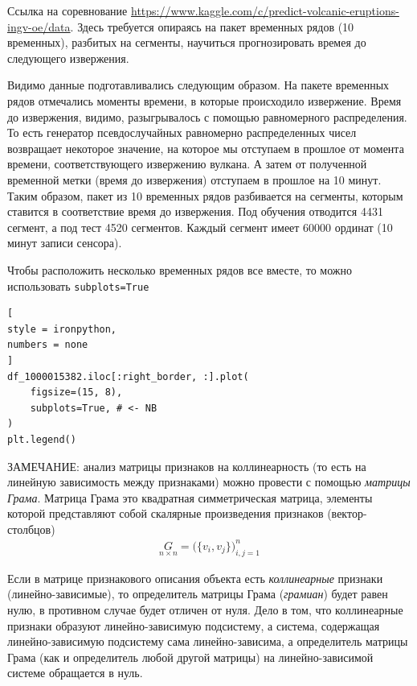 \documentclass[%
	11pt,
	a4paper,
	utf8,
		]{article}
\begin{document}
Ссылка на соревнование \url{https://www.kaggle.com/c/predict-volcanic-eruptions-ingv-oe/data}. Здесь требуется опираясь на пакет временных рядов (10 временных), разбитых на сегменты, научиться прогнозировать времея до следующего извержения.

Видимо данные подготавливались следующим образом. На пакете временных рядов отмечались моменты времени, в которые происходило извержение. Время до извержения, видимо, разыгрывалось с помощью равномерного распределения. То есть генератор псевдослучайных равномерно распределенных чисел возвращает некоторое значение, на которое мы отступаем в прошлое от момента времени, соответствующего извержению вулкана. А затем от полученной временной метки (время до извержения) отступаем в прошлое на 10 минут. Таким образом, пакет из 10 временных рядов разбивается на сегменты, которым ставится в соответствие время до извержения. Под обучения отводится 4431 сегмент, а под тест 4520 сегментов. Каждый сегмент имеет 60000 ординат (10 минут записи сенсора).

Чтобы расположить несколько временных рядов все вместе, то можно использовать \texttt{subplots=True}
\begin{lstlisting}[
style = ironpython,
numbers = none	
]
df_1000015382.iloc[:right_border, :].plot(
    figsize=(15, 8),
    subplots=True, # <- NB
)
plt.legend()
\end{lstlisting}

ЗАМЕЧАНИЕ: анализ матрицы признаков на коллинеарность (то есть на линейную зависимость между признаками) можно провести с помощью \emph{матрицы Грама}. Матрица Грама это квадратная симметрическая матрица, элементы которой представляют собой скалярные произведения признаков (вектор-столбцов)
\begin{align*}
	\underset{n \times n}{G}  = \Big( \lbrace v_i, v_j \rbrace \Big)_{i, j=1}^n
\end{align*}

Если в матрице признакового описания объекта есть \emph{коллинеарные} признаки (линейно-зависимые), то определитель матрицы Грама (\emph{грамиан}) будет равен нулю, в противном случае будет отличен от нуля. Дело в том, что коллинеарные признаки образуют линейно-зависимую подсистему, а система, содержащая линейно-зависимую подсистему сама линейно-зависима, а определитель матрицы Грама (как и определитель любой другой матрицы) на линейно-зависимой системе обращается в нуль.
\end{document}
